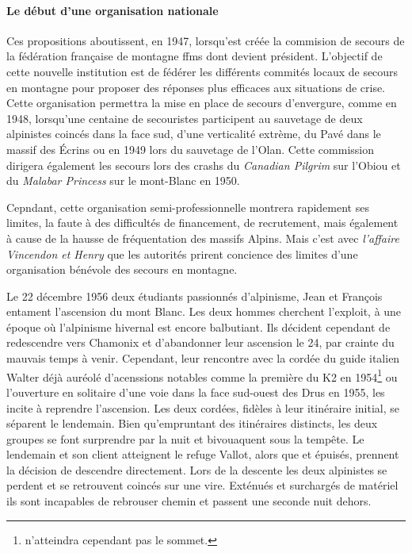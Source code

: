 \paragraph{Le début d'une organisation nationale}

Ces propositions aboutissent, en 1947, lorsqu'est créée la commision
de secours de la fédération française de montagne \acp{ffm} dont
 devient président. L'objectif de cette nouvelle
institution est de fédérer les différents commités locaux de secours
en montagne pour proposer des réponses plus efficaces aux situations
de crise. Cette organisation permettra la mise en place de secours
d'envergure, comme en 1948, lorsqu'une centaine de secouristes
participent au sauvetage de deux alpinistes coincés dans la face sud,
d'une verticalité extrème, du Pavé dans le massif des
Écrins ou en 1949 lors du sauvetage de
l'Olan. Cette commission dirigera également
les secours lors des crashs du \emph{Canadian Pilgrim} sur l'Obiou et
du \emph{Malabar Princess} sur le mont-Blanc en
1950.

Cepndant, cette organisation semi-professionnelle montrera rapidement
ses limites, la faute à des difficultés de financement, de
recrutement, mais également à cause de la hausse de fréquentation des
massifs Alpins. Mais c'est avec \emph{l'affaire
  Vincendon et Henry} que les autorités prirent concience des limites
d'une organisation bénévole des secours en montagne.

Le 22 décembre 1956 deux étudiants passionnés d'alpinisme, Jean
 et François  entament l’ascension du mont
Blanc. Les deux hommes cherchent l'exploit, à
une époque où l'alpinisme hivernal est encore balbutiant. Ils décident
cependant de redescendre vers Chamonix et d'abandonner leur ascension
le 24, par crainte du mauvais temps à venir. Cependant, leur rencontre
avec la cordée du guide italien Walter  déjà auréolé
d'acenssions notables comme la première du K2 en
1954\footnote{ n'atteindra cependant pas le sommet.} ou
l'ouverture en solitaire d'une voie dans la face sud-ouest des Drus en
1955, les incite à reprendre l’ascension. Les deux cordées, fidèles à
leur itinéraire initial, se séparent le lendemain. Bien qu'empruntant
des itinéraires distincts, les deux groupes se font surprendre par la
nuit et bivouaquent sous la tempête. Le lendemain  et son
client atteignent le refuge Vallot, alors que  et
 épuisés, prennent la décision de descendre
directement. Lors de la descente les deux alpinistes se perdent et se
retrouvent coincés sur une vire. Exténués et surchargés de matériel
ils sont incapables de rebrouser chemin et passent une seconde nuit
dehors.

